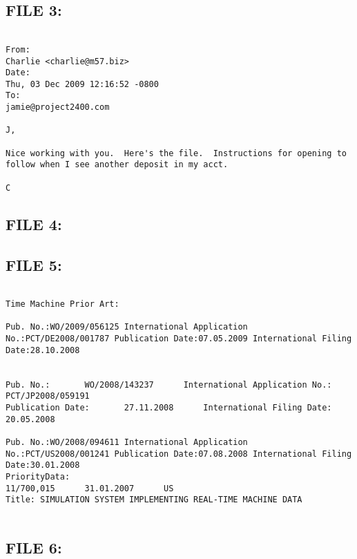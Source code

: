 \subsection{FILE 3:}
\label{sec:charlie_daten_3}

\begin{lstlisting}

From:
Charlie <charlie@m57.biz>
Date:
Thu, 03 Dec 2009 12:16:52 -0800
To:
jamie@project2400.com

J,

Nice working with you.  Here's the file.  Instructions for opening to follow when I see another deposit in my acct.

C

\end{lstlisting}

\subsection{FILE 4:}
\label{sec:charlie_daten_4}


\subsection{FILE 5:}
\label{sec:charlie_daten_5}

\begin{lstlisting}

Time Machine Prior Art:

Pub. No.:WO/2009/056125 International Application No.:PCT/DE2008/001787 Publication Date:07.05.2009 International Filing Date:28.10.2008


Pub. No.:		WO/2008/143237		International Application No.:		PCT/JP2008/059191
Publication Date:		27.11.2008		International Filing Date:		20.05.2008

Pub. No.:WO/2008/094611 International Application No.:PCT/US2008/001241 Publication Date:07.08.2008 International Filing Date:30.01.2008
PriorityData:
11/700,015		31.01.2007		US
Title: SIMULATION SYSTEM IMPLEMENTING REAL-TIME MACHINE DATA


\end{lstlisting}

\subsection{FILE 6:}
\label{sec:charlie_daten_6}


